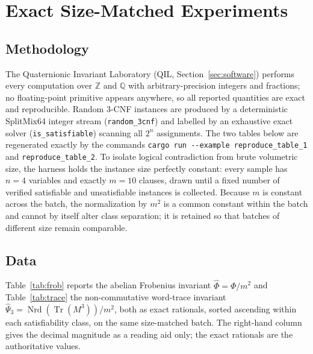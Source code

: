 \documentclass[pdflatex,sn-mathphys-num]{sn-jnl}
\theoremstyle{thmstyleone}%
\theoremstyle{thmstyletwo}%
\theoremstyle{thmstylethree}%
\newcommand{\QQ}{\mathbb{Q}}
\newcommand{\ZZ}{\mathbb{Z}}
\newcommand{\Nrd}{\operatorname{Nrd}}
\newcommand{\Tr}{\operatorname{Tr}}
\begin{document}
\newpage

\section{Exact Size-Matched Experiments}\label{sec:experiments}

\subsection{Methodology}

The Quaternionic Invariant Laboratory (QIL, Section~\ref{sec:software})
performs every computation over $\ZZ$ and $\QQ$ with arbitrary-precision
integers and fractions; no floating-point primitive appears anywhere, so all
reported quantities are exact and reproducible. Random $3$-CNF instances are
produced by a deterministic SplitMix64 integer stream (\texttt{random\_3cnf})
and labelled by an exhaustive exact solver (\texttt{is\_satisfiable}) scanning
all $2^n$ assignments. The two tables below are regenerated exactly by the
commands \texttt{cargo run -{}-example reproduce\_table\_1} and
\texttt{reproduce\_table\_2}. To isolate logical contradiction from brute
volumetric size, the harness holds the instance size perfectly constant:
every sample has $n=4$ variables and exactly $m=10$ clauses, drawn until a
fixed number of verified satisfiable and unsatisfiable instances is
collected. Because $m$ is constant across the batch, the normalization by
$m^2$ is a common constant within the batch and cannot by itself alter class
separation; it is retained so that batches of different size remain
comparable.

\subsection{Data}

Table~\ref{tab:frob} reports the abelian Frobenius invariant
$\widehat\Phi=\Phi/m^2$ and Table~\ref{tab:trace} the non-commutative
word-trace invariant $\widehat\Psi_3=\Nrd(\Tr(M^3))/m^2$, both as exact
rationals, sorted ascending within each satisfiability class, on the same
size-matched batch. The right-hand column gives the decimal magnitude as a
reading aid only; the exact rationals are the authoritative values.
\end{document}
